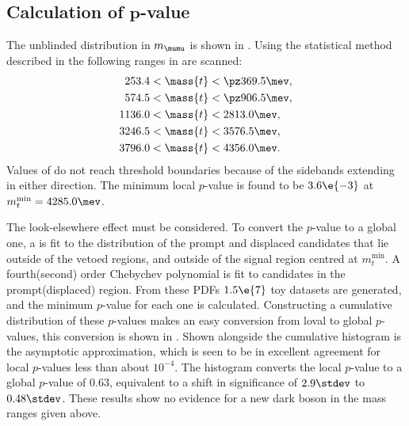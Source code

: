 \subsection[Calculation of $p$-value]
{Calculation of $\boldsymbol{p}$-value}

The unblinded distribution in $m_{\mumu}$ is shown in .
Using the statistical method described in  the following ranges in 
are scanned:
\begin{align*}
  253.4 &< \mass{t} < \pz369.5 \mev, \\
  574.5 &< \mass{t} < \pz906.5 \mev, \\
  1136.0 &< \mass{t} < 2813.0 \mev, \\
  3246.5 &< \mass{t} < 3576.5 \mev, \\
  3796.0 &< \mass{t} < 4356.0 \mev.
\end{align*}
Values of  do not reach threshold boundaries because of the sidebands extending in either
direction.
The minimum local $p$-value is found to be $3.6\e{-3}$ at $m_{t}^\mathrm{min} = 4285.0\mev$.

The look-elsewhere effect must be considered.
To convert the $p$-value to a global one, a \PDF is fit to the \mass{\mumu} distribution of the
prompt and displaced \btokstrdb candidates that lie outside of the vetoed regions, and outside of
the signal region centred at $m_t^\mathrm{min}$.
A fourth(second) order Chebychev polynomial is fit to candidates in the prompt(displaced) region.
From these \glspl{PDF} $1.5\e{7}$ toy datasets are generated, and the minimum $p$-value for each
one is calculated.
Constructing a cumulative distribution of these $p$-values makes an easy conversion from loval to
global $p$-values, this conversion is shown in .
Shown alongside the cumulative histogram is the asymptotic approximation, which is seen to be in
excellent agreement for local $p$-values less than about $10^{-4}$.
The histogram converts the local $p$-value to a global $p$-value of $0.63$, equivalent to a shift
in significance of $2.9\stdev$ to $0.48\stdev$.
These results show no evidence for a new dark boson in the mass ranges given above.

